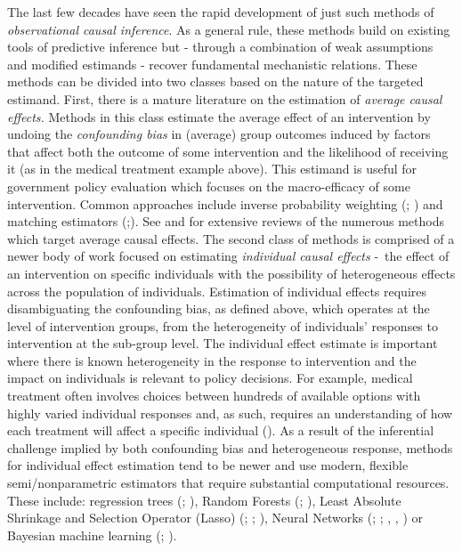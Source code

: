 \documentclass[../main.tex]{subfiles}
\begin{document}
\vspace{\baselineskip}
The last few decades have seen the rapid development of just such methods of \textit{observational causal inference}. As a general rule, these methods build on existing tools of predictive inference but - through a combination of weak assumptions and modified estimands - recover fundamental mechanistic relations. These methods can be divided into two classes based on the nature of the targeted estimand. First, there is a mature literature on the estimation of \textit{average causal effects. }Methods in this class estimate the average effect of an intervention by undoing the \textit{confounding bias} in (average) group outcomes induced by factors that affect both the outcome of some intervention and the likelihood of receiving it (as in the medical treatment example above). This estimand is useful for government policy evaluation which focuses on the macro-efficacy of some intervention. Common approaches include inverse probability weighting (\cite{Horvitz1952AUniverse}; \cite{Hirano2003EfficientScore}) and matching estimators (\cite{Rubin1974EstimatingStudies};\cite{Rosenbaum1983TheEffects}). See \cite{Imbens2009RecentEvaluation} and \cite{Athey2017TheEvaluation} for extensive reviews of the numerous methods which target average causal effects. The second class of methods is comprised of a newer body of work focused on estimating \textit{individual causal effects }-\ the effect of an intervention on specific individuals with the possibility of heterogeneous effects across the population of individuals. Estimation of individual effects requires disambiguating the confounding bias, as defined above, which operates at the level of intervention groups, from the heterogeneity of individuals’ responses to intervention at the sub-group level. The individual effect estimate is important where there is known heterogeneity in the response to intervention and the impact on individuals is relevant to policy decisions. For example, medical treatment often involves choices between hundreds of available options with highly varied individual responses and, as such, requires an understanding of how each treatment will affect a specific individual (\cite{Lu2018EstimatingMethods}). As a result of the inferential challenge implied by both confounding bias and heterogeneous response, methods for individual effect estimation tend to be newer and use modern, flexible semi/nonparametric estimators that require substantial computational resources. These include: regression trees (\cite{Su2009SubgroupTsai}; \cite{Athey2016RecursiveEffects}), Random Forests (\cite{Wager2018EstimationForests}; \cite{Athey2019GeneralizedForests}), Least Absolute Shrinkage and Selection Operator (Lasso) (\cite{Qian2011PerformanceRules}; \cite{Tian2014ACovariates}; \cite{Chen2017AScoring}), Neural Networks  (\cite{Johansson2016LearningInference}; \cite{Johansson2018LearningDesigns}; \cite{Schwab2018PerfectNetworks}, \cite{Li2017MatchingEstimation}, \cite{Kunzel2018TransferNetworks}) or Bayesian machine learning (\cite{Hill2011BayesianInference}; \cite{Taddy2016AExperimentation}).\par
\end{document}

